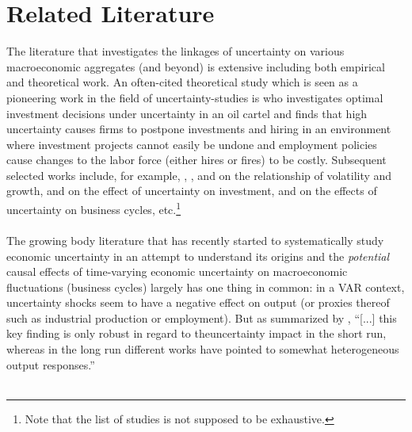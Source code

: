 \documentclass[a4paper,12pt,oneside,pointednumbers,bibtotoc,bigheadings,liststotoc]{scrbook}
\begin{document}
\chapter{Related Literature}
\label{UncertaintyandBusinessCyclesRelatedLiterature}
The literature that investigates the linkages of uncertainty on various macroeconomic aggregates (and beyond) is extensive including both empirical and theoretical work. An often-cited theoretical study which is seen as a pioneering work in the field of uncertainty-studies is \citet{bernanke:83} who investigates optimal investment decisions under uncertainty in an oil cartel and finds that high uncertainty causes firms to postpone investments and hiring in an environment where investment projects cannot easily be undone and employment policies cause changes to the labor force (either hires or fires) to be costly. Subsequent selected works include, for example, \citet{rameyandramey:95}, \citet{aghionetal:05}, \citet{mills:00} and \citet{imbs:07} on the relationship of volatility and growth, \citet{leahyandwhited:96} and \citet{bloometal:07} on the effect of uncertainty on investment, \citet{barlevy:04} and \citet{gilchristandwilliams:05} on the effects of uncertainty on business cycles, etc.\footnote{Note that the list of studies is not supposed to be exhaustive.} \\
\\
The growing body literature that has recently started to systematically study economic uncertainty in an attempt to understand its origins and the \textit{potential} causal effects of time-varying economic uncertainty on macroeconomic fluctuations (business cycles) largely has one thing in common: in a VAR context, uncertainty shocks seem to have a negative effect on output (or proxies thereof such as industrial production or employment). But as summarized by \citet[p. 23]{bontempietal:16}, ``[...] this key finding is only robust in regard to theuncertainty impact in the short run, whereas in the long run different works have pointed to somewhat heterogeneous output responses.'' \\
\\
\end{document}
